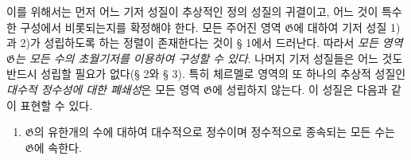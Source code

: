 
이를 위해서는 먼저 어느 기저 성질이 추상적인 정의 성질의 귀결이고, 어느 것이 특수한 구성에서 비롯되는지를 확정해야 한다. 모든 주어진 영역 $\mathfrak G$에 대하여 기저 성질 1)과 2)가 성립하도록 하는 정렬이 존재한다는 것이 § 1에서 드러난다. 따라서 \emph{모든 영역 $\mathfrak G$는 모든 수의 초월기저를 이용하여 구성할 수 있다}. 나머지 기저 성질들은 어느 것도 반드시 성립할 필요가 없다(§ 2와 § 3). 특히 체르멜로 영역의 또 하나의 추상적 성질인 \emph{대수적 정수성에 대한 폐쇄성}은 모든 영역 $\mathfrak G$에 성립하지 않는다. 이 성질은 다음과 같이 표현할 수 있다.
\begin{enumerate}
\item[V.] $\mathfrak G$의 유한개의 수에 대하여 대수적으로 정수이며 정수적으로 종속되는 모든 수는 $\mathfrak G$에 속한다.
\end{enumerate}
